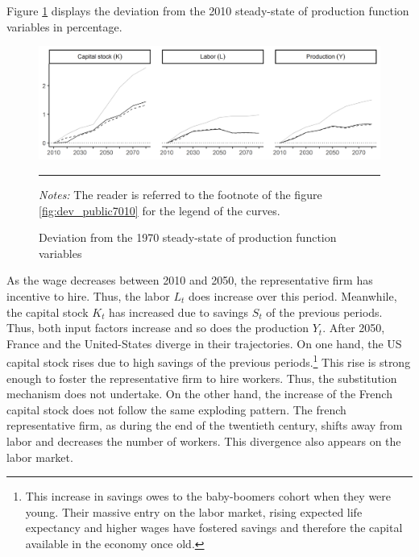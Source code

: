 Figure \ref{fig:dev_prod1080} displays the deviation from the 2010 steady-state of production function variables in percentage.
\begin{figure}[tb]
	\centering
	\includegraphics[width=1\linewidth]{../result/deviation/dev_prod1080.png}
	\caption{Deviation from the 1970 steady-state of production function variables}
	\label{fig:dev_prod1080}
	\vspace{.5ex}
	\hrule
	\vspace{-4ex}
	\justify\singlespacing\footnotesize \textit{Notes:} The reader is referred to the footnote of the figure \ref{fig:dev_public7010} for the legend of the curves.
\end{figure}
As the wage decreases between 2010 and 2050, the representative firm has incentive to hire. Thus, the labor $L_t$ does increase over this period. Meanwhile, the capital stock $K_t$ has increased due to savings $S_t$ of the previous periods. Thus, both input factors increase and so does the production $Y_t$. After 2050, France and the United-States diverge in their trajectories. On one hand, the US capital stock rises due to high savings of the previous periods.\footnote{This increase in savings owes to the baby-boomers cohort when they were young. Their massive entry on the labor market, rising expected life expectancy and higher wages have fostered savings and therefore the capital available in the economy once old.} This rise is strong enough to foster the representative firm to hire workers. Thus, the substitution mechanism does not undertake. On the other hand, the increase of the French capital stock does not follow the same exploding pattern. The french representative firm, as during the end of the twentieth century, shifts away from labor and decreases the number of workers. This divergence also appears on the labor market.

